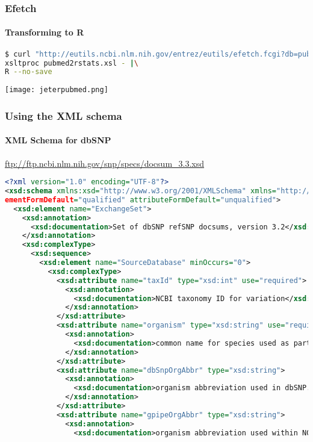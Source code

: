 \documentclass{beamer}
\begin{document}
\begin{frame}[fragile]
\frametitle{Efetch}
\framesubtitle{Transforming to R}

\begin{lstlisting}[language=bash,basicstyle=\tiny,breaklines=true,escapechar=\!]
$ curl "http://eutils.ncbi.nlm.nih.gov/entrez/eutils/efetch.fcgi?db=pubmed&usehistory=true&WebEnv=NCID_1_52434791_130.14.22.215_9001_1375957034_1619786167&query_key=1&retmode=xml" |\
xsltproc pubmed2rstats.xsl - |\
R --no-save
\end{lstlisting}

\begin{center}
\texttt{[image: jeterpubmed.png]}
\end{center}
\end{frame}



\begin{frame}[fragile]
\frametitle{Using the XML schema}
\framesubtitle{XML Schema for dbSNP}
\url{ftp://ftp.ncbi.nlm.nih.gov/snp/specs/docsum_3.3.xsd}
\begin{lstlisting}[language=xml,basicstyle=\tiny,breaklines=false]
<?xml version="1.0" encoding="UTF-8"?>
<xsd:schema xmlns:xsd="http://www.w3.org/2001/XMLSchema" xmlns="http://www.ncbi.nlm.nih.gov/SNP/docsum" targetNamespace="http://www.ncbi.nlm.nih.gov/SNP/docsum" el
ementFormDefault="qualified" attributeFormDefault="unqualified">
  <xsd:element name="ExchangeSet">
    <xsd:annotation>
      <xsd:documentation>Set of dbSNP refSNP docsums, version 3.2</xsd:documentation>
    </xsd:annotation>
    <xsd:complexType>
      <xsd:sequence>
        <xsd:element name="SourceDatabase" minOccurs="0">
          <xsd:complexType>
            <xsd:attribute name="taxId" type="xsd:int" use="required">
              <xsd:annotation>
                <xsd:documentation>NCBI taxonomy ID for variation</xsd:documentation>
              </xsd:annotation>
            </xsd:attribute>
            <xsd:attribute name="organism" type="xsd:string" use="required">
              <xsd:annotation>
                <xsd:documentation>common name for species used as part of database name.</xsd:documentation>
              </xsd:annotation>
            </xsd:attribute>
            <xsd:attribute name="dbSnpOrgAbbr" type="xsd:string">
              <xsd:annotation>
                <xsd:documentation>organism abbreviation used in dbSNP. </xsd:documentation>
              </xsd:annotation>
            </xsd:attribute>
            <xsd:attribute name="gpipeOrgAbbr" type="xsd:string">
              <xsd:annotation>
                <xsd:documentation>organism abbreviation used within NCBI genome pipeline data dumps.</xsd:documentation>
\end{lstlisting}
\end{frame}
\end{document}
